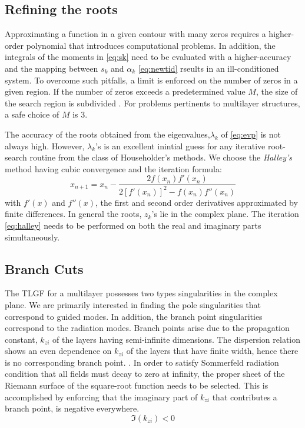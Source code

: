 \documentclass[11pt]{article}
\begin{document}
\subsection{Refining the roots}
%
Approximating a function in a given contour with many zeros requires a higher-order polynomial that introduces computational problems. In addition, the integrals of the moments in \eqref{eq:sk} need to be evaluated with a higher-accuracy and the mapping between $s_k$ and $\alpha_k$ \eqref{eq:newtid} rseults in an ill-conditioned system. To overcome such pitfalls, a limit is enforced on the number of zeros in a given region. If the number of zeros exceeds a predetermined value $M$, the size of the search region is subdivided \cite{Delves1967c}. For problems pertinents to multilayer structures, a safe choice of $M$ is $3$.

The accuracy of the roots obtained from the eigenvalues,$\lambda_k$ of \eqref{eq:evp} is not always high. However, $\lambda_k$'s is an excellent inintial guess for any iterative root-search routine from the class of Householder's methods. We choose the \emph{Halley's} method having cubic convergence and the iteration formula:
%
\begin{equation}
  x_{n+1} = x_n - \frac {2 f(x_n) f'(x_n)} {2 {[f'(x_n)]}^2 - f(x_n) f''(x_n)}
  \label{eq:halley}
\end{equation}
%
with $f'(x)$ and $f''(x)$, the first and second order derivatives approximated by finite differences. In general the roots, $z_k$'s lie in the complex plane. The iteration \eqref{eq:halley} needs to be performed on both the real and imaginary parts simultaneously.

\subsection{Branch Cuts}

The TLGF for a multilayer possesses two types singularities in the complex plane. We are primarily interested in finding the pole singularities that correspond to guided modes. In addition, the branch point singularities correspond to the radiation modes. Branch points arise due to the propagation constant, $k_{zi}$ of the layers having semi-infinite dimensions. The dispersion relation shows an even dependence on $k_{zi}$ of the layers that have finite width, hence there is no corresponding branch point.   \cite[Section~5.3a]{felsen1994}. In order to satisfy Sommerfeld radiation condition that all fields must decay to zero at infinity, the proper sheet of the Riemann surface of the square-root function needs to be selected. This is accomplished by enforcing that the imaginary part of $k_{zi}$ that contributes a branch point, is negative everywhere.
%
\begin{equation}
  \Im (k_{zi}) < 0
  \label{eq:proper}
\end{equation}
%
\clearpage %
% 


\end{document}
